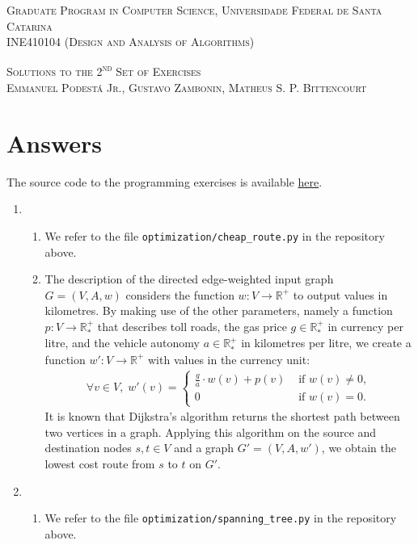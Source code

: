 \documentclass[12pt]{article}
\begin{document}
\textsc{Graduate Program in Computer Science,
  Universidade Federal de Santa Catarina} \\
\textsc{INE410104 (Design and Analysis of Algorithms)}

\textsc{Solutions to the 2\textsuperscript{nd} Set of Exercises} \\
\textsc{Emmanuel Podestá Jr., Gustavo Zambonin, Matheus S. P. Bittencourt}

\section{Answers}

The source code to the programming exercises is available \href{https://github.com/zambonin/villedieu}{here}.

\begin{enumerate}
  \item
  \begin{enumerate}
    \item We refer to the file \texttt{optimization/cheap\_route.py} in the repository above.
    \item The description of the directed edge-weighted input graph $G = (V, A, w)$ considers the function $w : V \to \mathbb{R}^{+}$ to output values in kilometres. By making use of the other parameters, namely a function $p : V \to \mathbb{R}_{*}^{+}$ that describes toll roads, the gas price $g \in \mathbb{R}_{*}^{+}$ in currency per litre, and the vehicle autonomy $a \in \mathbb{R}_{*}^{+}$ in kilometres per litre, we create a function $w' : V \to \mathbb{R}^{+}$ with values in the currency unit:
    \begin{align*}
      \forall v \in V, \; w'(v) = 
      \begin{cases}
        \frac{g}{a} \cdot w(v) + p(v) & \text{ if } w(v) \neq 0, \\
        0 & \text{ if } w(v) = 0.
      \end{cases}
    \end{align*}
    It is known that Dijkstra's algorithm returns the shortest path between two vertices in a graph. Applying this algorithm on the source and destination nodes $s, t \in V$ and a graph $G' = (V, A, w')$, we obtain the lowest cost route from $s$ to $t$ on $G'$.
  \end{enumerate}
  \item
  \begin{enumerate}
    \item We refer to the file \texttt{optimization/spanning\_tree.py} in the repository above.

\end{enumerate}
\end{enumerate}
\end{document}
